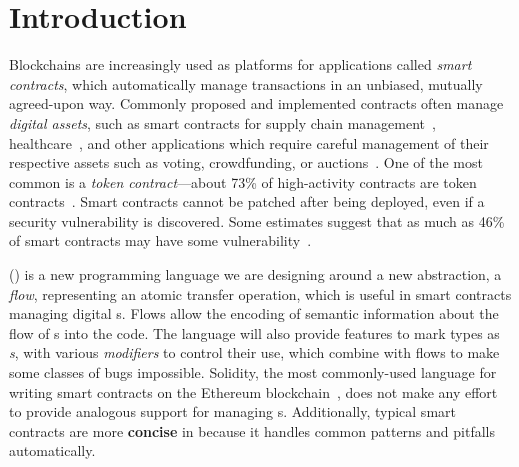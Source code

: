 \documentclass[nonacm, dvipsnames, usenames, sigconf]{acmart}
\begin{document}

\maketitle

\section{Introduction}

Blockchains are increasingly used as platforms for applications called \emph{smart contracts}, which automatically manage transactions in an unbiased, mutually agreed-upon way.
Commonly proposed and implemented contracts often manage \emph{digital assets}, such as smart contracts for supply chain management~\cite{SupplyChainUse}, healthcare~\cite{HealthcareUse}, and other applications which require careful management of their respective assets such as voting, crowdfunding, or auctions~\cite{Elsden18:Making}.
One of the most common is a \emph{token contract}---about 73\% of high-activity contracts are token contracts~\cite{OlivaEtAl2019}.
Smart contracts cannot be patched after being deployed, even if a security vulnerability is discovered.
Some estimates suggest that as much as 46\% of smart contracts may have some vulnerability~\cite{luuOyente}.

\langName (\langNamePronounce) is a new programming language we are designing around a new abstraction, a \emph{flow}, representing an atomic transfer operation, which is useful in smart contracts managing digital \assetTxt{}s.
Flows allow the encoding of semantic information about the flow of \assetTxt{}s into the code.
The \langName language will also provide features to mark types as \emph{\assetTxt{}s}, with various \emph{modifiers} to control their use, which combine with flows to make some classes of bugs impossible.
Solidity, the most commonly-used language for writing smart contracts on the Ethereum blockchain~\cite{EthereumForDevs}, does not make any effort to provide analogous support for managing \assetTxt{}s.
Additionally, typical smart contracts are more \textbf{concise} in \langName because it handles common patterns and pitfalls automatically.
\end{document}
